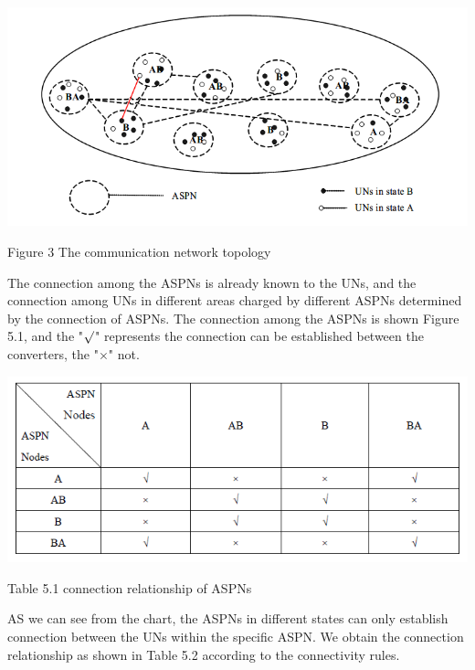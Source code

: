 \documentclass{article}
\begin{document}
\centerline{\includegraphics[width=.6\textwidth]{Figure3.png}}
\centerline{Figure 3 The communication network topology }


The connection among the ASPNs is already known to the UNs, and the connection among UNs in different areas charged by
different ASPNs determined by the connection of ASPNs. The connection among the ASPNs is shown Figure 5.1, and the
"\(\surd\)" represents the connection can be established between the converters, the "\(\times\)" not.
\par
\centerline{\includegraphics[width=.5\textwidth]{Table1.png}}
\centerline{Table 5.1 connection relationship of ASPNs}

AS we can see from the chart, the ASPNs in different states can only establish connection between the UNs within the
specific ASPN. We obtain the connection relationship as shown in Table 5.2 according to the connectivity rules.
\end{document}
